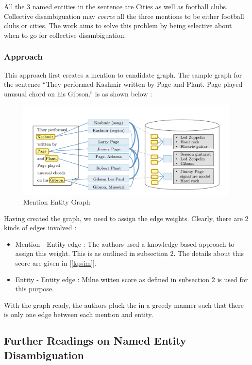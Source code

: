 All the 3 named entities in the sentence are Cities as well as football clubs.
Collective disambiguation may \emph{coerce} all the three mentions to be 
either football clubs or cities. The work aims to solve this problem by being selective about when to go for collective disambiguation.

\subsubsection{Approach}
This approach first creates a mention to candidate graph. The sample graph for the sentence ``They performed Kashmir 
written by Page and Plant. Page played unusual chord on his Gibson.'' is as shown below : 
 \begin{figure}[H]
 \centering
 \includegraphics[scale=0.23]{./megraph.png}
 \caption{Mention Entity Graph}
\end{figure}


Having created the graph, we need to assign the edge weights. Clearly, there are 2 kinds of edges involved : 
\begin{itemize}
 \item Mention - Entity edge : The authors used a knowledge based approach to assign this weight. This is as outlined in subsection 2.
 The details about this score are given in [\ref{kpsim}].
 \item Entity - Entity edge : Milne witten score as defined in subsection 2 is used for this purpose.
\end{itemize}

With the graph ready, the authors pluck the in a greedy manner such that there is only one edge between each 
mention and entity.


\subsection{Further Readings on Named Entity Disambiguation}

